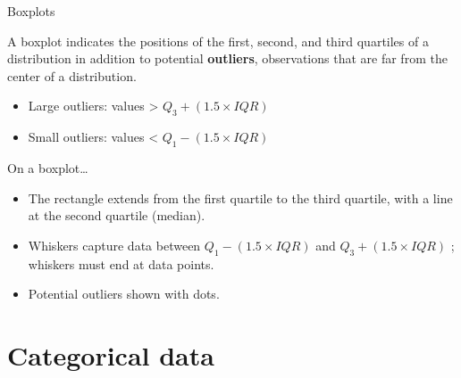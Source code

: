 \documentclass[10pt]{beamer}\usepackage[]{graphicx}\usepackage[]{color}
\makeatletter
\newcommand{\hlopt}[1]{\textcolor[rgb]{0,0,0}{#1}}%
\newcommand{\hlstd}[1]{\textcolor[rgb]{0.345,0.345,0.345}{#1}}%
\newcommand{\hlkwd}[1]{\textcolor[rgb]{0.737,0.353,0.396}{\textbf{#1}}}%
\newenvironment{kframe}{%
 \def\at@end@of@kframe{}%
 \ifinner\ifhmode%
  \def\at@end@of@kframe{\end{minipage}}%
  \begin{minipage}{\columnwidth}%
 \fi\fi%
 \def\FrameCommand##1{\hskip\@totalleftmargin \hskip-\fboxsep
 \colorbox{shadecolor}{##1}\hskip-\fboxsep
     \hskip-\linewidth \hskip-\@totalleftmargin \hskip\columnwidth}%
 \MakeFramed {\advance\hsize-\width
   \@totalleftmargin\z@ \linewidth\hsize
   \@setminipage}}%
 {\par\unskip\endMakeFramed%
 \at@end@of@kframe}
\newenvironment{knitrout}{}{} %
\makeatother
\begin{document}
\begin{frame}{Boxplots}
			\protect\hypertarget{boxplots}{}
			
			A boxplot indicates the positions of the first, second, and third
			quartiles of a distribution in addition to potential \textbf{outliers},
			observations that are far from the center of a distribution.
			
			\begin{itemize}
				\item
				Large outliers: values \textgreater{} \(Q_3 + (1.5\times IQR)\)
				\item
				Small outliers: values \textless{} \(Q_1 - (1.5 \times IQR)\)
			\end{itemize}
			
			On a boxplot\ldots{}
			
			\begin{itemize}
				\item
				The rectangle extends from the first quartile to the third quartile,
				with a line at the second quartile (median).
				\item
				Whiskers capture data between \(Q_1 - (1.5 \times IQR)\) and
				\(Q_3 + (1.5\times IQR)\) ; whiskers must end at data points.
				\item
				Potential outliers shown with dots.
			\end{itemize}
			
\end{frame}
		
		\hypertarget{categorical-data}{%
	\section{Categorical data}\label{categorical-data}}
		
				
\end{document}
